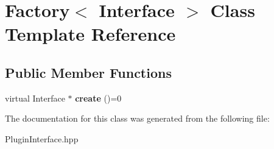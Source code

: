 \hypertarget{classFactory}{\section{Factory$<$ Interface $>$ Class Template Reference}
\label{classFactory}
}
\subsection*{Public Member Functions}
\begin{DoxyCompactItemize}
\item 
\hypertarget{classFactory_a4c394e88313e4c77ca1a850d94222ced}{virtual Interface $\ast$ {\bfseries create} ()=0}\label{classFactory_a4c394e88313e4c77ca1a850d94222ced}

\end{DoxyCompactItemize}


The documentation for this class was generated from the following file\+:\begin{DoxyCompactItemize}
\item 
Plugin\+Interface.\+hpp\end{DoxyCompactItemize}
